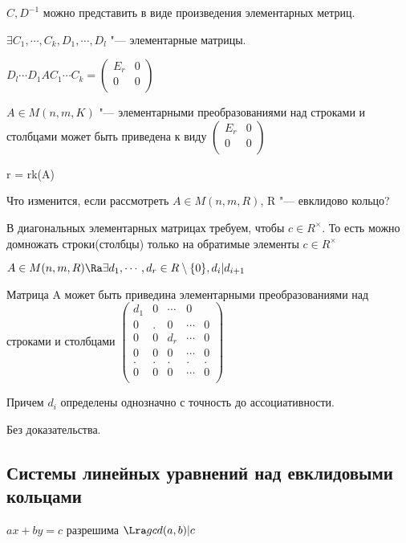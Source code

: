 $C, D^{-1}$ можно представить в виде произведения элементарных метриц. 
\begin{conseq}
$\exists C_1, \cdots, C_k, D_1, \cdots, D_l$ "--- элементарные матрицы. 

$D_l \cdots D_1 A C_1 \cdots C_k =  
\begin{pmatrix}
E_{r}&0\\
0&0\\
\end{pmatrix}$
\end{conseq}
\begin{conseq}
$A \in M(n, m, K)$ "--- элементарными преобразованиями над строками и столбцами 
может быть приведена к виду $ 
\begin{pmatrix}
E_{r}&0\\
0&0\\
\end{pmatrix}$

r = rk(A)
\end{conseq}

Что изменится, если рассмотреть $A \in M(n, m, R)$, R "--- евклидово кольцо?

В диагональных элементарных матрицах требуем, чтобы $c \in R^{\times}$. То есть
можно домножать строки(столбцы) только на обратимые элементы $c \in R^{\times}$

\begin{theorem}{}
$A \in M(n, m, R) \Ra \exists d_1, \cdots, d_r \in R\setminus \{0\}, d_i|d_{i + 1}$

Матрица A может быть приведина элементарными преобразованиями над строками и столбцами $
\begin{pmatrix}
d_1&0&\cdots&0\\
0&.&0&\cdots&0\\
0&0&d_r&\cdots&0\\
0&0&0&\cdots&0\\
.&.&.&.&.\\
0&0&0&\cdots&0\\
\end{pmatrix}
$

Причем $d_i$ определены однозначно с точность до ассоциативности. 
\end{theorem}

Без доказательства.
\subsection{Системы линейных уравнений над евклидовыми кольцами}

$ax + by = c$ разрешима $\Lra gcd(a, b)|c$

